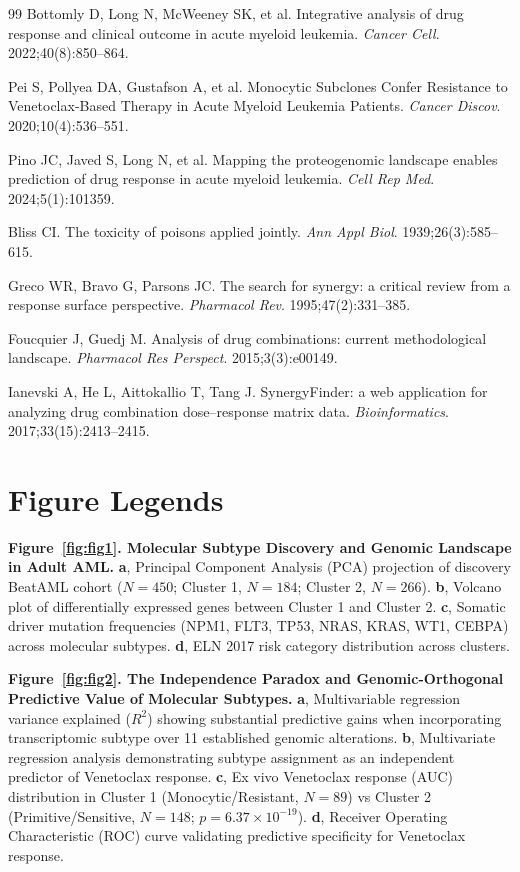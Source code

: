 \documentclass[11pt,a4paper]{article}
\begin{document}
\begin{thebibliography}{99}
Bottomly D, Long N, McWeeney SK, et al.
Integrative analysis of drug response and clinical outcome in acute myeloid leukemia.
\textit{Cancer Cell}. 2022;40(8):850--864.

Pei S, Pollyea DA, Gustafson A, et al.
Monocytic Subclones Confer Resistance to Venetoclax-Based Therapy in Acute Myeloid Leukemia Patients.
\textit{Cancer Discov}. 2020;10(4):536--551.

Pino JC, Javed S, Long N, et al.
Mapping the proteogenomic landscape enables prediction of drug response in acute myeloid leukemia.
\textit{Cell Rep Med}. 2024;5(1):101359.


Bliss CI.
The toxicity of poisons applied jointly.
\textit{Ann Appl Biol}. 1939;26(3):585--615.

Greco WR, Bravo G, Parsons JC.
The search for synergy: a critical review from a response surface perspective.
\textit{Pharmacol Rev}. 1995;47(2):331--385.

Foucquier J, Guedj M.
Analysis of drug combinations: current methodological landscape.
\textit{Pharmacol Res Perspect}. 2015;3(3):e00149.

Ianevski A, He L, Aittokallio T, Tang J.
SynergyFinder: a web application for analyzing drug combination dose--response matrix data.
\textit{Bioinformatics}. 2017;33(15):2413--2415.

\end{thebibliography}

\newpage

\section*{Figure Legends}

\textbf{Figure~\ref{fig:fig1}. Molecular Subtype Discovery and Genomic Landscape in Adult AML.} \textbf{a}, Principal Component Analysis (PCA) projection of discovery BeatAML cohort ($N=450$; Cluster 1, $N=184$; Cluster 2, $N=266$). \textbf{b}, Volcano plot of differentially expressed genes between Cluster 1 and Cluster 2. \textbf{c}, Somatic driver mutation frequencies (NPM1, FLT3, TP53, NRAS, KRAS, WT1, CEBPA) across molecular subtypes. \textbf{d}, ELN 2017 risk category distribution across clusters.

\textbf{Figure~\ref{fig:fig2}. The Independence Paradox and Genomic-Orthogonal Predictive Value of Molecular Subtypes.} \textbf{a}, Multivariable regression variance explained ($R^2$) showing substantial predictive gains when incorporating transcriptomic subtype over 11 established genomic alterations. \textbf{b}, Multivariate regression analysis demonstrating subtype assignment as an independent predictor of Venetoclax response. \textbf{c}, Ex vivo Venetoclax response (AUC) distribution in Cluster 1 (Monocytic/Resistant, $N=89$) vs Cluster 2 (Primitive/Sensitive, $N=148$; $p = 6.37 \times 10^{-19}$). \textbf{d}, Receiver Operating Characteristic (ROC) curve validating predictive specificity for Venetoclax response.
\end{document}
